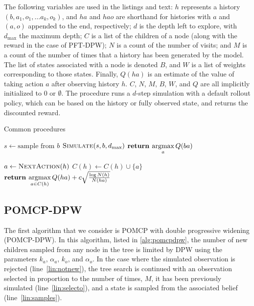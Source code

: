 The following variables are used in the listings and text:
$h$ represents a history $(b, a_1, o_1, \dots a_k, o_k)$, and $ha$ and $hao$ are shorthand for histories with $a$ and $(a,o)$ appended to the end, respectively;
$d$ is the depth left to explore, with $d_\text{max}$ the maximum depth;
$C$ is a list of the children of a node (along with the reward in the case of PFT-DPW);
$N$ is a count of the number of visits; and $M$ is a count of the number of times that a history has been generated by the model.
The list of states associated with a node is denoted $B$, and $W$ is a list of weights corresponding to those states.
Finally, $Q(ha)$ is an estimate of the value of taking action $a$ after observing history $h$.
$C$, $N$, $M$, $B$, $W$, and $Q$ are all implicitly initialized to \num{0} or $\emptyset$.
The  procedure runs a $d$-step simulation with a default rollout policy, which can be based on the history or fully observed state, and returns the discounted reward.

\begin{algorithm}[htbp]
    \caption{Common procedures} \label{alg:common}
    \begin{algorithmic}[1]
                \State $s \gets \text{sample from }b$
                \State $\Call{Simulate}{s, b, d_\text{max}}$
            \EndFor
            \State $\textbf{return } \underset{a}{\argmax}\, Q(ba)$
        \EndProcedure

                \State $a \gets \Call{NextAction}{h}$
                \State $C(h) \gets C(h) \cup \{a\}$
            \EndIf
            \State $\textbf{return } \underset{a \in C(h)}{\argmax}\, Q(ha) + c \sqrt{\frac{\log N(h)}{N(ha)}}$
        \EndProcedure

    \end{algorithmic}
\end{algorithm}


\subsection{POMCP-DPW} \label{sec:pomcpdpw}

The first algorithm that we consider is POMCP with double progressive widening (POMCP-DPW).
In this algorithm, listed in \cref{alg:pomcpdpw}, the number of new children sampled from any node in the tree is limited by DPW using the parameters $k_a$, $\alpha_a$, $k_o$, and $\alpha_o$.
In the case where the simulated observation is rejected (line~\ref{lin:notnew}), the tree search is continued with an observation selected in proportion to the number of times, $M$, it has been previously simulated (line~\ref{lin:selecto}), and a state is sampled from the associated belief (line~\ref{lin:samples}).

